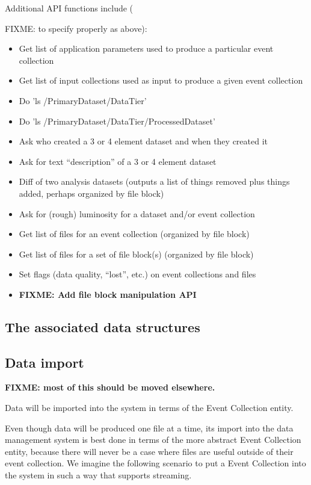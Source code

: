 \documentclass{cmspaper}
\begin{document}
Additional API functions include ({FIXME: to specify properly as above):
\begin{itemize}
\item Get list of application parameters used to produce a particular event
      collection
\item Get list of input collections used as input to produce a given event
      collection
\item Do 'ls /PrimaryDataset/DataTier'
\item Do 'ls /PrimaryDataset/DataTier/ProcessedDataset'
\item Ask who created a 3 or 4 element dataset and when they created it
\item Ask for text ``description'' of a 3 or 4 element dataset
\item Diff of two analysis datasets (outputs a list of things removed plus
      things added, perhaps organized by file block)
\item Ask for (rough) luminosity for a dataset and/or event collection
\item Get list of files for an event collection (organized by file block)
\item Get list of files for a set of file block(s) (organized by file block)
\item Set flags (data quality, ``lost'', etc.) on event collections and files
\item {\bf FIXME: Add file block manipulation API}
\end{itemize}

\subsection{The associated data structures}

\subsection{Data import}

{\bf FIXME: most of this should be moved elsewhere.}

Data will be imported into the system in terms of the 
Event Collection entity.  

Even though data will be produced one file at a time, its import  
into the data management system is best done in terms of the 
more abstract Event Collection entity, because there will 
never be a case where files are useful outside of their event collection. 
We imagine the following scenario to put  a Event Collection 
into the system in such a way that supports streaming.

}
\end{document}
